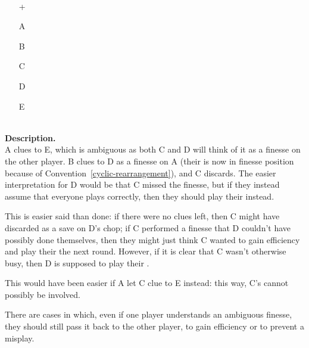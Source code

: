 \begin{example}	\hfill \\
	\label{ex:ambiguous-finesse}
	\begin{minipage}{0.45\textwidth}
		\begin{itemize}
			\item[\Large +]      
			\item[\Large A]    
			\item[\Large B]    
			\item[\Large C]     
			\item[\Large D]    
			\item[\Large E]    
		\end{itemize}
	\end{minipage}%
	\begin{minipage}{0.55\textwidth}
		\hfill \\
		
		\textbf{Description.} \\
		
		A clues  to E, which is ambiguous as both C and D will think of it as a finesse on the other player. B clues  to D as a finesse on A (their  is now in finesse position because of Convention~\ref{cyclic-rearrangement}), and C discards. The easier interpretation for D would be that C missed the finesse, but if they instead assume that everyone plays correctly, then they should play their  instead.
		
		This is easier said than done: if there were no clues left, then C might have discarded as a save on D's chop; if C performed a finesse that D couldn't have possibly done themselves, then they might just think C wanted to gain efficiency and play their  the next round. However, if it is clear that C wasn't otherwise busy, then D is supposed to play their .
		
		This would have been easier if A let C clue  to E instead: this way, C's  cannot possibly be involved.
	\end{minipage}
\end{example} \vspace{0.15 cm}

There are cases in which, even if one player understands an ambiguous finesse, they should still pass it back to the other player, to gain efficiency or to prevent a misplay.

